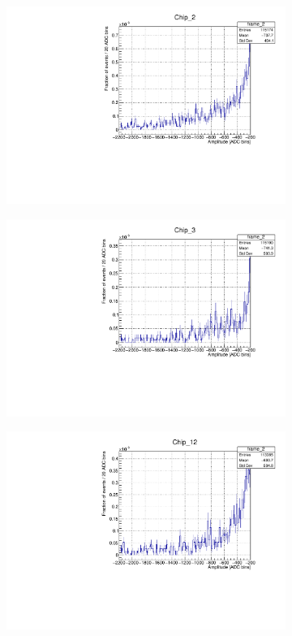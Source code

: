 \documentclass[12pt]{article}
\begin{document}
\begin{figure}[t]
	\centering
	\begin{subfigure}[t]{0.45\textwidth}
		\centering
		\includegraphics[width=\textwidth]{Chip_2_amp_hist_eff}
	\end{subfigure}
	\begin{subfigure}[t]{0.45\textwidth}
		\centering
		\includegraphics[width=\textwidth]{Chip_3_amp_hist_eff}
	\end{subfigure}
	\begin{subfigure}[t]{0.45\textwidth}
		\centering
		\includegraphics[width=\textwidth]{Chip_12_amp_hist_eff}

\end{subfigure}
\end{figure}
\end{document}
